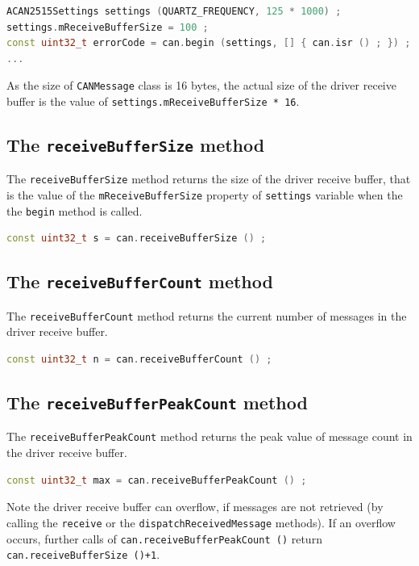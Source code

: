 \documentclass[10pt, a4paper, obeyspaces, openany]{extarticle}
\begin{document}
{ \small\begin{lstlisting}[language=c++]
ACAN2515Settings settings (QUARTZ_FREQUENCY, 125 * 1000) ;
settings.mReceiveBufferSize = 100 ;
const uint32_t errorCode = can.begin (settings, [] { can.isr () ; }) ;
...
\end{lstlisting}}

As the size of \texttt{CANMessage} class is 16 bytes, the actual size of the driver receive buffer is the value of \texttt{settings.mReceiveBufferSize * 16}.


\subsection{The \texttt{receiveBufferSize} method}

The \texttt{receiveBufferSize} method returns the size of the driver receive buffer, that is the value of the \texttt{mReceiveBufferSize} property of \texttt{settings} variable when the the \texttt{begin} method is called.
{ \small\begin{lstlisting}[language=c++]
const uint32_t s = can.receiveBufferSize () ;
\end{lstlisting}}


\subsection{The \texttt{receiveBufferCount} method}

The \texttt{receiveBufferCount} method returns the current number of messages in the driver receive buffer.
{ \small\begin{lstlisting}[language=c++]
const uint32_t n = can.receiveBufferCount () ;
\end{lstlisting}}


\subsection{The \texttt{receiveBufferPeakCount} method}

The \texttt{receiveBufferPeakCount} method returns the peak value of message count in the driver receive buffer.
{ \small\begin{lstlisting}[language=c++]
const uint32_t max = can.receiveBufferPeakCount () ;
\end{lstlisting}}

Note the driver receive buffer can overflow, if messages are not retrieved (by calling the \texttt{receive} or the \texttt{dispatchReceivedMessage} methods). If an overflow occurs, further calls of \texttt{can.receiveBufferPeakCount ()} return \texttt{can.receiveBufferSize ()+1}.
\end{document}
